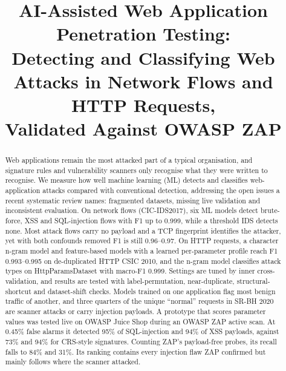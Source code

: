 \documentclass[conference]{IEEEtran}
\begin{document}
\title{AI-Assisted Web Application Penetration Testing:\\
Detecting and Classifying Web Attacks in Network Flows and HTTP Requests,\\
Validated Against OWASP ZAP}

\author{
}

\maketitle

\begin{abstract}
Web applications remain the most attacked part of a typical organisation, and signature rules
and vulnerability scanners only recognise what they were written to recognise. We measure how
well machine learning (ML) detects and classifies web-application attacks compared with
conventional detection, addressing the open issues a recent systematic review names: fragmented
datasets, missing live validation and inconsistent evaluation. On network flows (CIC-IDS2017),
six ML models detect brute-force, XSS and SQL-injection flows with F1 up to 0.999, while a
threshold IDS detects none. Most attack flows carry no payload and a TCP fingerprint identifies
the attacker, yet with both confounds removed F1 is still 0.96--0.97. On HTTP requests, a
character n-gram model and feature-based models with a learned per-parameter profile reach F1
0.993--0.995 on de-duplicated HTTP CSIC 2010, and the n-gram model classifies attack types on
HttpParamsDataset with macro-F1 0.999. Settings are tuned by inner cross-validation, and results
are tested with label-permutation, near-duplicate, structural-shortcut and dataset-shift checks. Models
trained on one application flag most benign traffic of another, and three quarters of the unique
``normal'' requests in SR-BH 2020 are scanner attacks or carry injection payloads. A prototype
that scores parameter values was tested live on OWASP Juice Shop during an OWASP ZAP active scan.
At 0.45\% false alarms it detected 95\% of SQL-injection and 94\% of XSS payloads, against 73\%
and 94\% for CRS-style signatures. Counting ZAP's payload-free probes, its recall falls to 84\% and
31\%. Its ranking contains every injection flaw ZAP confirmed but mainly follows where the scanner
attacked.
\end{abstract}
\end{document}
